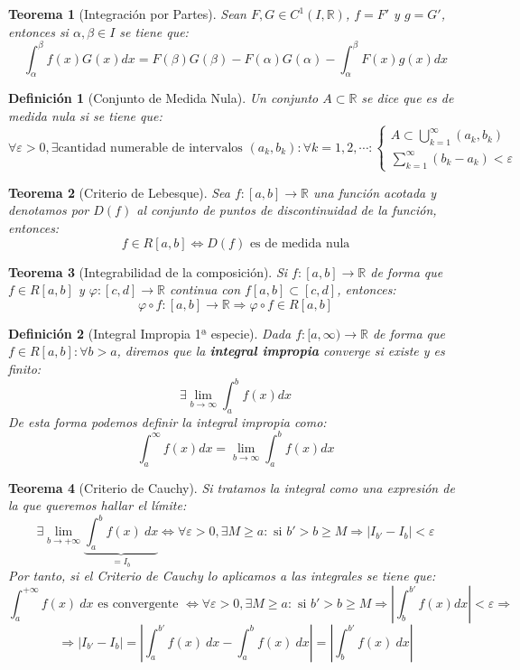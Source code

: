 \documentclass[10pt,a4paper,openright]{book}
\newtheorem{teorema}{Teorema}[chapter]
\newtheorem{definicion}{Definición}[chapter]
\begin{document}
\begin{teorema}[Integración por Partes]
Sean $F,G\in C^1(I,\mathbb R)$, $f=F'$ y $g=G'$, entonces si $\alpha,\beta\in I$ se tiene que:
$$\int_{\alpha}^{\beta} f(x)G(x)dx = F(\beta)G(\beta) - F(\alpha)G(\alpha)-\int_{\alpha}^{\beta} F(x)g(x)dx$$
\end{teorema}

\begin{definicion}[Conjunto de Medida Nula]
Un conjunto $A\subset \mathbb R$ se dice que es de medida nula si se tiene que:
$$\forall \varepsilon > 0, \exists \mbox{cantidad numerable de intervalos }(a_k,b_k):\forall k = 1,2,\cdots: \begin{cases} A \displaystyle \subset  \displaystyle\bigcup^\infty_{k=1}(a_k,b_k) \\ \displaystyle \sum_{k=1}^{\infty} (b_k - a_k) < \varepsilon\end{cases}$$
\end{definicion}

\begin{teorema}[Criterio de Lebesque]
Sea $f:[a,b]\rightarrow \mathbb R$ una función acotada y denotamos por $D(f)$ al conjunto de puntos de discontinuidad de la función, entonces:
$$f\in R[a,b]\Leftrightarrow D(f) \mbox{ es de medida nula}$$
\end{teorema}

\begin{teorema}[Integrabilidad de la composición]
Si $f: [a,b]\rightarrow \mathbb R$ de forma que $f\in R[a,b]$ y $\varphi: [c,d]\rightarrow \mathbb R$ continua con $f[a,b]\subset[c,d]$, entonces:
$$\varphi \circ f: [a,b]\rightarrow \mathbb R\Rightarrow \varphi\circ f \in R[a,b]$$
\end{teorema}

\begin{definicion}[Integral Impropia 1ª especie]
Dada $f:[a,\infty)\rightarrow  \mathbb R$ de forma que $f\in R[a,b]: \forall b>a$, diremos que la \textbf{integral impropia} converge si existe y es finito:
$$\exists \lim_{b \to \infty} \int_{a}^{b} f(x)dx $$
De esta forma podemos definir la integral impropia como:
$$\int_{a}^{\infty} f(x)dx = \lim_{b \to \infty} \int_{a}^{b} f(x)dx$$
\end{definicion}

\begin{teorema}[Criterio de Cauchy]
Si tratamos la integral como una expresión de la que queremos hallar el límite:
$$\exists \lim_{b \to +\infty} \underbrace{\int_{a}^{b} f(x)\ dx}_{=I_b} \Leftrightarrow \forall \varepsilon > 0, \exists M \geq a: \mbox{ si } b'>b\geq M \Rightarrow |I_{b'} - I_b| < \varepsilon$$
Por tanto, si el Criterio de Cauchy lo aplicamos a las integrales se tiene que:
$$\int_{a}^{+\infty} f(x)\ dx\mbox{ es convergente }\Leftrightarrow \forall \varepsilon > 0, \exists M \geq a: \mbox{ si } b'>b\geq M \Rightarrow \left| \int_{b}^{b'} f(x)dx \right|< \varepsilon \Rightarrow$$
$$\Rightarrow |I_{b'}-I_b| = |\int_{a}^{b'} f(x)\ dx -\int_{a}^{b} f(x) \ dx| = |\int_{b}^{b'} f(x)\ dx|$$
\end{teorema}
\end{document}
